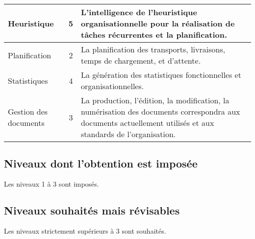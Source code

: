 \begin{tabularx}{\linewidth}{>{\centering}m{2.0cm} c X}
	\hline
	Heuristique & 5 & \og{}L'intelligence\fg{} de l'heuristique organisationnelle pour la réalisation de tâches récurrentes et la planification. \\
	\hline
	Planification & 2 & La planification des transports, livraisons, temps de chargement, et d'attente. \\
	\hline
	Statistiques & 4 & La génération des statistiques fonctionnelles et organisationnelles. \\
	\hline
	Gestion des documents & 3 & La production, l'édition, la modification, la numérisation des documents correspondra aux documents actuellement utilisés et aux standards de l'organisation. \\
	\bottomrule
\end{tabularx}

\subsection{Niveaux dont l'obtention est imposée}
Les niveaux 1 à 3 sont imposés.

\subsection{Niveaux souhaités mais révisables}
Les niveaux strictement supérieurs à 3 sont souhaités.

